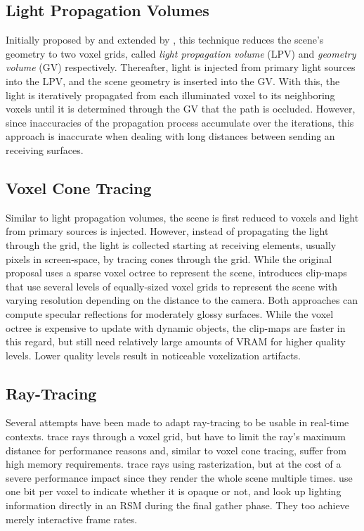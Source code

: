 \subsection{Light Propagation Volumes}

Initially proposed by \citet{Kaplanyan:2010:LPV} and extended by \citet{Kaplanyan:2010:LPV2}, this technique reduces the scene's geometry to two voxel grids, called \emph{light propagation volume} (LPV) and \emph{geometry volume} (GV) respectively. Thereafter, light is injected from primary light sources into the LPV, and the scene geometry is inserted into the GV. With this, the light is iteratively propagated from each illuminated voxel to its neighboring voxels until it is determined through the GV that the path is occluded. However, since inaccuracies of the propagation process accumulate over the iterations, this approach is inaccurate when dealing with long distances between sending an receiving surfaces.


\subsection{Voxel Cone Tracing}

Similar to light propagation volumes, the scene is first reduced to voxels and light from primary sources is injected. However, instead of propagating the light through the grid, the light is collected starting at receiving elements, usually pixels in screen-space, by tracing cones through the grid.
While the original proposal \citep{Crassin:2012:OctreeVCT} uses a sparse voxel octree to represent the scene, \citet{Panteleev:2015:VXGI} introduces clip-maps that use several levels of equally-sized voxel grids to represent the scene with varying resolution depending on the distance to the camera.
Both approaches can compute specular reflections for moderately glossy surfaces. While the voxel octree is expensive to update with dynamic objects, the clip-maps are faster in this regard, but still need relatively large amounts of VRAM for higher quality levels. Lower quality levels result in noticeable voxelization artifacts.


\subsection{Ray-Tracing}

Several attempts have been made to adapt ray-tracing to be usable in real-time contexts.
\citet{Thiedemann:2011:VGI} trace rays through a voxel grid, but have to limit the ray's maximum distance for performance reasons and, similar to voxel cone tracing, suffer from high memory requirements.
\citet{Tokuyoshi:2012:pathtracingrasterization} trace rays using rasterization, but at the cost of a severe performance impact since they render the whole scene multiple times.
\citet{Chen:2016:Compactvoxels} use one bit per voxel to indicate whether it is opaque or not, and look up lighting information directly in an RSM during the final gather phase. They too achieve merely interactive frame rates.


